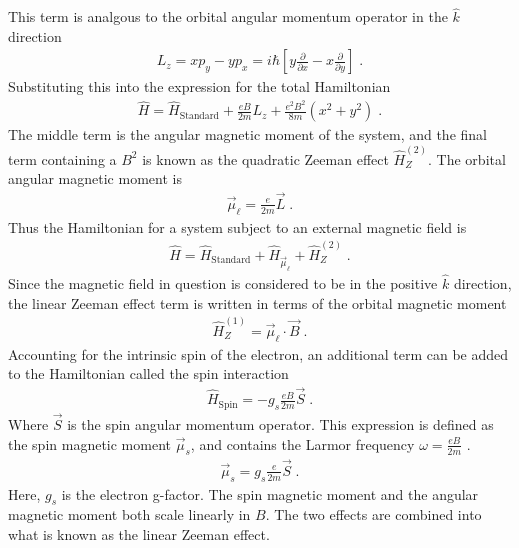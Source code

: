         \noindent This term is analgous to the orbital angular momentum operator in the $\hat{k}$ direction 
        \begin{align}
            L_z = xp_y - yp_x = i\hbar \left[y \frac{\partial}{\partial x} - x \frac{\partial}{\partial y} \right]\;.
        \end{align}
        \noindent Substituting this into the expression for the total Hamiltonian
        \begin{align}
            \hat{H} =  \hat{H}_{\text{Standard}} + \frac{eB}{2m} L_z + \frac{e^2B^2}{8m} \left(x^2 + y^2\right)\;.
        \end{align}
        \noindent The middle term is the angular magnetic moment of the system, and the final term containing a $B^2$ is known as the quadratic Zeeman effect $\hat{H}_Z^{(2)}$. The orbital angular magnetic moment is \cite{Basdevant_Dalibard_2002}
        \begin{align}
            \vec{\mu}_\ell = \frac{e}{2m} \vec{L}\;.
        \end{align}
        \noindent Thus the Hamiltonian for a system subject to an external magnetic field is
        \begin{align}
            \hat{H} =  \hat{H}_{\text{Standard}} + \hat{H}_{\vec{\mu}_\ell} + \hat{H}_Z^{(2)} \;.
        \end{align}
        \noindent Since the magnetic field in question is considered to be in the positive $\hat{k}$ direction, the linear Zeeman effect term is written in terms of the orbital magnetic moment 
        \begin{align}
            \hat{H}_Z^{(1)} = \vec{\mu}_\ell \cdot \vec{B}\;.
        \end{align}
        \noindent Accounting for the intrinsic spin of the electron, an additional term can be added to the Hamiltonian called the spin interaction \cite{Sakurai_Napolitano_2020}
        \begin{align}
            \hat{H}_{\text{Spin}} = -g_s \frac{eB}{2m} \vec{S}\;.
        \end{align}
        \noindent Where $\vec{S}$ is the spin angular momentum operator. This expression is defined as the spin magnetic moment $\vec{\mu}_s$, and contains the Larmor frequency $\omega = \frac{eB}{2m}$ \cite{Foot_2005}.
        \begin{align}
            \vec{\mu}_s = g_s \frac{e}{2m} \vec{S}\;.
        \end{align}
        \noindent Here, $g_s$ is the electron g-factor. The spin magnetic moment and the angular magnetic moment both scale linearly in $B$. The two effects are combined into what is known as the linear Zeeman effect.
